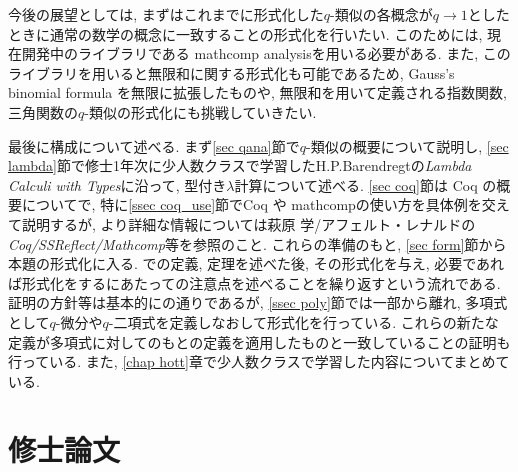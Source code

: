 \documentclass[11pt]{jsreport}
\theoremstyle{mystyle}
\newcommand{\0}{\textbf{0}}
\newcommand{\1}{\textbf{1}}
\newcommand{\2}{\textbf{2}}
\begin{document}
今後の展望としては, まずはこれまでに形式化した$q$-類似の各概念が$q \to 1$としたときに通常の数学の概念に一致することの形式化を行いたい. このためには, 現在開発中のライブラリである mathcomp analysis\cite{coq ana}を用いる必要がある. また, このライブラリを用いると無限和に関する形式化も可能であるため, Gauss's binomial formula を無限に拡張したものや, 無限和を用いて定義される指数関数, 三角関数の$q$-類似の形式化にも挑戦していきたい. 

最後に構成について述べる. 
まず\ref{sec qana}節で$q$-類似の概要について説明し, 
\ref{sec lambda}節で修士1年次に少人数クラスで学習したH.P.Barendregtの{\it Lambda Calculi with Types}\cite{Bar}に沿って, 型付き$\lambda$計算について述べる. 
\ref{sec coq}節は Coq の概要についてで, 特に\ref{ssec coq_use}節でCoq や mathcompの使い方を具体例を交えて説明するが, より詳細な情報については萩原 学/アフェルト・レナルドの{\it Coq/SSReflect/Mathcomp}\cite{Hag}等を参照のこと. 
これらの準備のもと, \ref{sec form}節から本題の形式化に入る. \cite{Kac}での定義, 定理を述べた後, その形式化を与え, 必要であれば形式化をするにあたっての注意点を述べることを繰り返すという流れである. 
証明の方針等は基本的に\cite{Kac}の通りであるが, \ref{ssec poly}節では一部\cite{Kac}から離れ, 多項式として$q$-微分や$q$-二項式を定義しなおして形式化を行っている. これらの新たな定義が多項式に対してのもとの定義を適用したものと一致していることの証明も行っている. また, \ref{chap hott}章で少人数クラスで学習した内容についてまとめている. 

\chapter{修士論文} \label{chap thesis}
\end{document}
